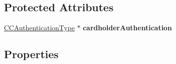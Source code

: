\subsection*{Protected Attributes}
\begin{DoxyCompactItemize}
\item 
\hypertarget{interface_transaction_details_type_ac1f918362c1fd0a8e741b650759090f7}{
\hyperlink{interface_c_c_authentication_type}{CCAuthenticationType} $\ast$ {\bfseries cardholderAuthentication}}
\label{interface_transaction_details_type_ac1f918362c1fd0a8e741b650759090f7}

\end{DoxyCompactItemize}
\subsection*{Properties}
